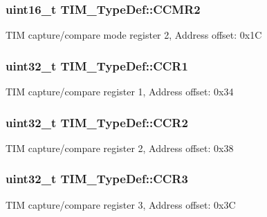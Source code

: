 \subsubsection[{\texorpdfstring{C\+C\+M\+R2}{CCMR2}}]{ uint16\+\_\+t T\+I\+M\+\_\+\+Type\+Def\+::\+C\+C\+M\+R2}\hypertarget{struct_t_i_m___type_def_a22bb9f39aae46365d3ec3c5973f90039}{}\label{struct_t_i_m___type_def_a22bb9f39aae46365d3ec3c5973f90039}
T\+IM capture/compare mode register 2, Address offset\+: 0x1C 
\subsubsection[{\texorpdfstring{C\+C\+R1}{CCR1}}]{ uint32\+\_\+t T\+I\+M\+\_\+\+Type\+Def\+::\+C\+C\+R1}\hypertarget{struct_t_i_m___type_def_a0dd9c06729a5eb6179c6d0d60faca7ed}{}\label{struct_t_i_m___type_def_a0dd9c06729a5eb6179c6d0d60faca7ed}
T\+IM capture/compare register 1, Address offset\+: 0x34 
\subsubsection[{\texorpdfstring{C\+C\+R2}{CCR2}}]{ uint32\+\_\+t T\+I\+M\+\_\+\+Type\+Def\+::\+C\+C\+R2}\hypertarget{struct_t_i_m___type_def_a4d1171e9a61538424b8ef1f2571986d0}{}\label{struct_t_i_m___type_def_a4d1171e9a61538424b8ef1f2571986d0}
T\+IM capture/compare register 2, Address offset\+: 0x38 
\subsubsection[{\texorpdfstring{C\+C\+R3}{CCR3}}]{ uint32\+\_\+t T\+I\+M\+\_\+\+Type\+Def\+::\+C\+C\+R3}\hypertarget{struct_t_i_m___type_def_ac83441bfb8d0287080dcbd945a272a74}{}\label{struct_t_i_m___type_def_ac83441bfb8d0287080dcbd945a272a74}
T\+IM capture/compare register 3, Address offset\+: 0x3C 
